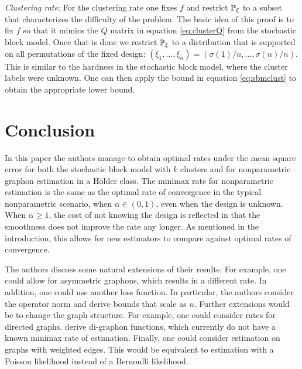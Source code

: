 \documentclass[11pt]{article}
\begin{document}
\textit{Clustering rate:} For the clustering rate one fixes $f$ and restrict $\mathbb{P}_{\xi}$ to a subset that characterizes the difficulty of the problem. The basic idea of this proof is to fix $f$ so that it mimics the $Q$ matrix in equation \ref{eq:clusterQ} from the stochastic block model. Once that is done we restrict $\mathbb{P}_{\xi}$ to a distribution that is supported on all permutations of the fixed design: $(\xi_1, \dots, \xi_n) = (\sigma(1)/n, \dots, \sigma(n)/n)$. This is similar to the hardness in the stochastic block model, where the cluster labels were unknown. One can then apply the bound in equation \ref{eq:sbmclust} to obtain the appropriate lower bound.

\section{Conclusion}\label{sec:conclusion}

In this paper the authors manage to obtain optimal rates under the mean square error for both the stochastic block model with $k$ clusters and for nonparametric graphon estimation in a H\"older class. The minimax rate for nonparametric estimation is the same as the optimal rate of convergence in the typical nonparametric scenario, when $\alpha \in (0,1)$, even when the design is unknown. When $\alpha \geq 1$, the cost of not knowing the design is reflected in that the smoothness does not improve the rate any longer. As mentioned in the introduction, this allows for new estimators to compare against optimal rates of convergence. 

The authors discuss some natural extensions of their results. For example, one could allow for asymmetric graphons, which results in a different rate. In addition, one could use another loss function. In particular, the authors consider the operator norm and derive bounds that scale as $n$. Further extensions would be to change the graph structure. For example, one could consider rates for directed graphs. \citep{cai2016digraphon} derive di-graphon functions, which currently do not have a known minimax rate of estimation. Finally, one could consider estimation on graphs with weighted edges. This would be equivalent to estimation with a Poisson likelihood instead of a Bernoulli likelihood.




\end{document}
